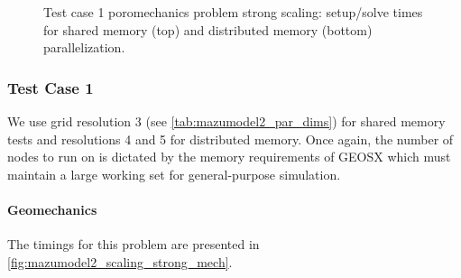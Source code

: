 \begin{figure} [htbp]
  \begin{subfigure}[t]{0.48\textwidth}
    \centering
    
  \end{subfigure}
  \hfill
  \begin{subfigure}[t]{0.48\textwidth}
    \centering
    
  \end{subfigure}
  \begin{subfigure}[t]{0.48\textwidth}
    \centering
    
  \end{subfigure}
  \hfill
  \begin{subfigure}[t]{0.48\textwidth}
    \centering
    
  \end{subfigure}
  \caption[Test case 1 poromechanics problem strong scaling]{Test case 1 poromechanics problem strong scaling: setup/solve times for shared memory (top) and distributed memory (bottom) parallelization.}
  \label{fig:cart_scaling_strong_poro}
\end{figure}

\subsubsection{Test Case 1}

We use grid resolution 3 (see \cref{tab:mazumodel2_par_dims}) for shared memory tests and resolutions 4 and 5 for distributed memory.   Once again, the number of nodes to run on is dictated by the memory requirements of GEOSX which must maintain a large working set for general-purpose simulation.

\paragraph{Geomechanics}
The timings for this problem are presented in \cref{fig:mazumodel2_scaling_strong_mech}.

